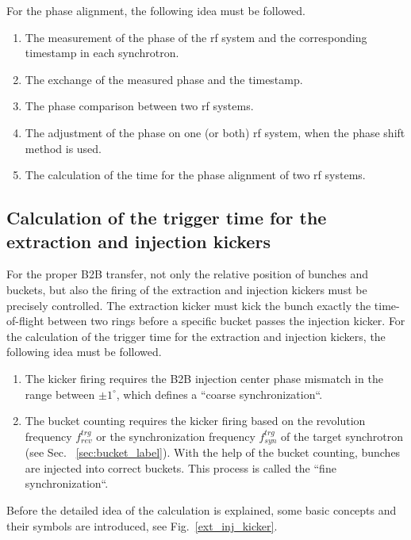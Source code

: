 For the phase alignment, the following idea must be followed. 
\begin{enumerate}
\item The measurement of the phase of the rf system and the corresponding timestamp in each synchrotron.
\item The exchange of the measured phase and the timestamp.
\item The phase comparison between two rf systems.
\item The adjustment of the phase on one (or both) rf system, when the phase shift method is used. 
\item The calculation of the time for the phase alignment of two rf systems.
\end{enumerate}
\subsection{Calculation of the trigger time for the extraction and injection kickers}
\label{sec:compensation}
For the proper B2B transfer, not only the relative position of bunches and buckets, but also the firing of the extraction and injection kickers must be precisely controlled. The extraction kicker must kick the bunch exactly the time-of-flight between two rings before a specific bucket passes the injection kicker. For the calculation of the trigger time for the extraction and injection kickers, the following idea must be followed. 
\begin{enumerate}
\item The kicker firing requires the B2B injection center phase mismatch in the range between $\pm 1^\circ$, which defines a ``coarse synchronization``.
\item The bucket counting requires the kicker firing based on the revolution frequency $f_{\mathit{rev}}^{\mathit{trg}}$ or the synchronization frequency $f_{\mathit{syn}}^{\mathit{trg}}$ of the target synchrotron (see Sec. ~\ref{sec:bucket_label}). With the help of the bucket counting, bunches are injected into correct buckets. This process is called the ``fine synchronization``.
\end{enumerate}

Before the detailed idea of the calculation is explained, some basic concepts and their symbols are introduced, see Fig.~\ref{ext_inj_kicker}.

